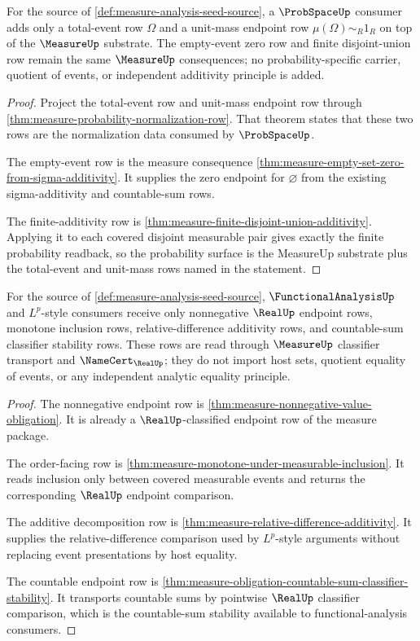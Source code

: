 \begin{theorem}
\label{thm:measure-probability-substrate-obligations}
For the source of \autoref{def:measure-analysis-seed-source}, a
$\ProbSpaceUp$ consumer adds only a total-event row $\Omega$ and a unit-mass
endpoint row $\mu(\Omega)\sim_R1_R$ on top of the $\MeasureUp$ substrate. The
empty-event zero row and finite disjoint-union row remain the same
$\MeasureUp$ consequences; no probability-specific carrier, quotient of
events, or independent additivity principle is added.
\end{theorem}
\begin{proof}
Project the total-event row and unit-mass endpoint row through
\autoref{thm:measure-probability-normalization-row}. That theorem states that
these two rows are the normalization data consumed by $\ProbSpaceUp$.

The empty-event row is the measure consequence
\autoref{thm:measure-empty-set-zero-from-sigma-additivity}. It supplies the
zero endpoint for $\varnothing$ from the existing sigma-additivity and
countable-sum rows.

The finite-additivity row is
\autoref{thm:measure-finite-disjoint-union-additivity}. Applying it to each
covered disjoint measurable pair gives exactly the finite probability
readback, so the probability surface is the MeasureUp substrate plus the
total-event and unit-mass rows named in the statement.
\end{proof}

\begin{theorem}
\label{thm:measure-functionalanalysis-substrate-obligations}
For the source of \autoref{def:measure-analysis-seed-source},
$\FunctionalAnalysisUp$ and $L^p$-style consumers receive only nonnegative
$\RealUp$ endpoint rows, monotone inclusion rows, relative-difference
additivity rows, and countable-sum classifier stability rows. These rows are
read through $\MeasureUp$ classifier transport and $\NameCert_{\RealUp}$; they
do not import host sets, quotient equality of events, or any independent
analytic equality principle.
\end{theorem}
\begin{proof}
The nonnegative endpoint row is
\autoref{thm:measure-nonnegative-value-obligation}. It is already a
$\RealUp$-classified endpoint row of the measure package.

The order-facing row is
\autoref{thm:measure-monotone-under-measurable-inclusion}. It reads inclusion
only between covered measurable events and returns the corresponding
$\RealUp$ endpoint comparison.

The additive decomposition row is
\autoref{thm:measure-relative-difference-additivity}. It supplies the
relative-difference comparison used by $L^p$-style arguments without replacing
event presentations by host equality.

The countable endpoint row is
\autoref{thm:measure-obligation-countable-sum-classifier-stability}. It
transports countable sums by pointwise $\RealUp$ classifier comparison, which
is the countable-sum stability available to functional-analysis consumers.
\end{proof}

